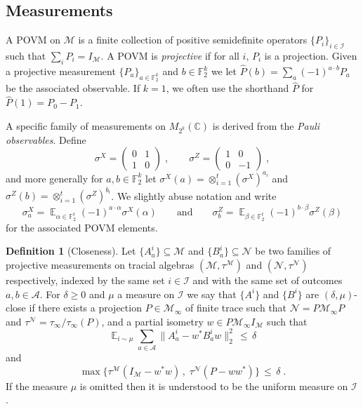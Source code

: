 \documentclass[11pt]{article}
\theoremstyle{definition}
\newtheorem{definition}[theorem]{Definition}
\newcommand{\Id}{\ensuremath{I}}
\DeclareMathOperator*{\Expectation}{\mathbb{E}}
\newcommand{\Es}[1]{\Expectation_{#1}}
\newcommand{\field}{\mathbb{F}_2}
\newcommand{\C}{\ensuremath{\mathbb{C}}}
\newcommand{\F}{\ensuremath{\mathbb{F}}}
\newcommand{\mA}{\ensuremath{\mathcal{A}}}
\newcommand{\mM}{\ensuremath{\mathcal{M}}}
\newcommand{\mI}{\ensuremath{\mathcal{I}}}
\newcommand{\mN}{\mathcal{N}}
\begin{document}
	
	\subsection{Measurements}
	
	A POVM on $\mM$ is a finite collection of positive semidefinite operators $\{P_i\}_{i\in \mI}$ such that $\sum_i P_i = \Id_\mM$. A POVM is \emph{projective} if for all $i$, $P_i$ is a projection. 
	Given a projective measurement $\{P_a\}_{a\in \field^k}$ and $b\in \field^k$ we let $\widehat{P}(b) = \sum_a (-1)^{a\cdot b} P_a$ be the associated observable. If $k=1$, we often use the shorthand $\widehat{P}$ for $\widehat{P}(1) = P_0-P_1$.
	
	A specific family of measurements on $M_{2^k}(\C)$ is derived from the \emph{Pauli observables}. Define 
	\[ \sigma^X = \begin{pmatrix} 0 & 1 \\ 1 & 0 \end{pmatrix}\;,\qquad \sigma^Z = \begin{pmatrix} 1 & 0 \\ 0 & -1\end{pmatrix}\;,\]
	and more generally for $a,b\in \F_2^k$ let $\sigma^X(a) = \otimes_{i=1}^t (\sigma^X)^{a_i}$ and $\sigma^Z(b) = \otimes_{i=1}^t (\sigma^Z)^{b_i}$. We slightly abuse notation and write 
	\[ \sigma^X_a = \Es{\alpha\in\F_2^t} (-1)^{a\cdot \alpha} \sigma^X(\alpha)\qquad\text{and}\qquad\sigma^Z_b = \Es{\beta\in\F_2^t} (-1)^{b\cdot\beta} \sigma^Z(\beta)\]
	for the associated POVM elements. 
	
	
	\begin{definition}[Closeness]\label{def:close}
Let $\{A^i_a\}\subseteq \mM$ and $\{B^i_a\}\subseteq \mN$ be two families of projective measurements on  tracial algebras $(\mM,\tau^\mM)$ and $(\mN,\tau^\mN)$ respectively, indexed by the same set $i\in \mI$ and with the same set of outcomes $a,b\in\mA$. For $\delta\geq0$ and $\mu$ a measure on $\mI$ we say that $\{A^i\}$ and $\{B^i\}$ are $(\delta,\mu)$-close if there exists a projection $P\in\mM_\infty$ of finite trace such that $\mN=P\mM_\infty P$ and $\tau^\mN=\tau_\infty/\tau_\infty(P)$, and a partial isometry $w\in P \mM_\infty \Id_\mM$ such that 
\[ \Es{i\sim\mu} \sum_{a\in\mA} \big\| A^i_a - w^* B^i_a w \big\|_2^2 \,\leq\,\delta\]
and 
\[\max\big\{ \tau^\mM(\Id_\mM-w^*w)\,,\; \tau^\mN(P-ww^*)\big\} \,\leq\, \delta\;.\]
If the measure $\mu$ is omitted then it is understood to be the uniform measure on $\mI$.
\end{definition}
	
\end{document}
